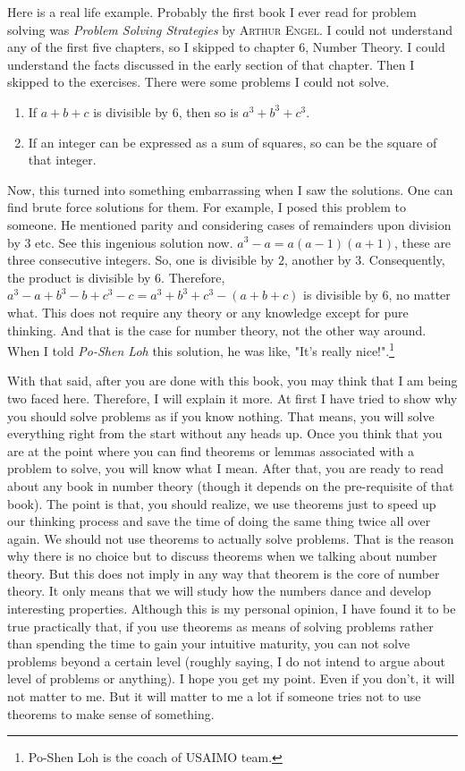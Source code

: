 \documentclass[a4paper, leqno]{article}
\theoremstyle{definition}
\theoremstyle{remark}
\begin{document}
		Here is a real life example. Probably the first book I ever read for problem solving was \textit{Problem Solving Strategies} by \textsc{Arthur Engel}. I could not understand any of the first five chapters, so I skipped to chapter $6$, Number Theory. I could understand the facts discussed in the early section of that chapter. Then I skipped to the exercises. There were some problems I could not solve.
			\begin{enumerate}
				\item If $a+b+c$ is divisible by $6$, then so is $a^3+b^3+c^3$.
				\item If an integer can be expressed as a sum of squares, so can be the square of that integer.
			\end{enumerate}
		Now, this turned into something embarrassing when I saw the solutions. One can find brute force solutions for them. For example, I posed this problem to someone. He mentioned parity and considering cases of remainders upon division by $3$ etc. See this ingenious solution now. $a^3-a=a(a-1)(a+1)$, these are three consecutive integers. So, one is divisible by $2$, another by $3$. Consequently, the product is divisible by $6$. Therefore, $a^3-a+b^3-b+c^3-c=a^3+b^3+c^3-(a+b+c)$ is divisible by $6$, no matter what. This does not require any theory or any knowledge except for pure thinking. And that is the case for number theory, not the other way around. When I told \textit{Po-Shen Loh} this solution, he was like, "It's really nice!".\footnote{Po-Shen Loh is the coach of USAIMO team.}
		
		With that said, after you are done with this book, you may think that I am being two faced here. Therefore, I will explain it more. At first I have tried to show why you should solve problems as if you know nothing. That means, you will solve everything right from the start without any heads up. Once you think that you are at the point where you can find theorems or lemmas associated with a problem to solve, you will know what I mean. After that, you are ready to read about any book in number theory (though it depends on the pre-requisite of that book). The point is that, you should realize, we use theorems just to speed up our thinking process and save the time of doing the same thing twice all over again. We should not use theorems to actually solve problems. That is the reason why there is no choice but to discuss theorems when we talking about number theory. But this does not imply in any way that theorem is the core of number theory. It only means that we will study how the numbers dance and develop interesting properties. Although this is my personal opinion, I have found it to be true practically that, if you use theorems as means of solving problems rather than spending the time to gain your intuitive maturity, you can not solve problems beyond a certain level (roughly saying, I do not intend to argue about level of problems or anything). I hope you get my point. Even if you don't, it will not matter to me. But it will matter to me a lot if someone tries not to use theorems to make sense of something.
		
\end{document}
